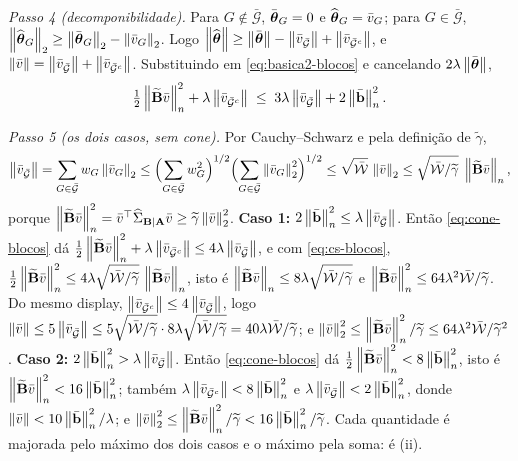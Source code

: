 \documentclass[11pt,a4paper]{article}
\newcommand{\Amat}{\mathbf{A}}
\newcommand{\Bmat}{\mathbf{B}}
\newcommand{\Btil}{\widetilde{\Bmat}}
\newcommand{\bb}{\mathbf{b}}
\newcommand{\gtil}{\widetilde{\gamma}}
\newcommand{\GBA}{\Gramhat_{\Bmat\mid\Amat}}
\newcommand{\thbar}{\bar{\btheta}}
\newcommand{\bbar}{\bar{\bb}}
\newcommand{\vbar}{\bar{v}}
\newcommand{\Gbar}{\bar{\mathcal{G}}}
\begin{document}
\emph{Passo 4 (decomponibilidade).} Para $G \notin \Gbar$, $\thbar_{G} = 0$ e
$\thetahat_{G} = \vbar_{G}$; para $G \in \Gbar$,
$\norm{\thetahat_{G}}_{2} \ge \norm{\thbar_{G}}_{2} - \norm{\vbar_{G}}_{2}$.
Logo $\norm{\thetahat} \ge \norm{\thbar} - \norm{\vbar_{\Gbar}} +
\norm{\vbar_{\Gbar^{c}}}$, e $\norm{\vbar} = \norm{\vbar_{\Gbar}} +
\norm{\vbar_{\Gbar^{c}}}$. Substituindo em \eqref{eq:basica2-blocos} e
cancelando $2\pen\norm{\thbar}$,
\begin{equation}
  \label{eq:cone-blocos}
  \tfrac12\normn{\Btil\vbar}^{2} + \pen\norm{\vbar_{\Gbar^{c}}}
  \;\le\; 3\pen\norm{\vbar_{\Gbar}} + 2\normn{\bbar}^{2}.
\end{equation}

\emph{Passo 5 (os dois casos, sem cone).} Por Cauchy--Schwarz e pela
definição de $\gtil$,
\begin{equation}
  \label{eq:cs-blocos}
  \norm{\vbar_{\Gbar}} = \sum_{G\in\Gbar}w_{G}\norm{\vbar_{G}}_{2}
  \le \Bigl(\sum_{G\in\Gbar}w_{G}^{2}\Bigr)^{1/2}
  \Bigl(\sum_{G\in\Gbar}\norm{\vbar_{G}}_{2}^{2}\Bigr)^{1/2}
  \le \sqrt{\bar{\mathcal{W}}}\,\norm{\vbar}_{2}
  \le \sqrt{\bar{\mathcal{W}}/\gtil}\;\normn{\Btil\vbar},
\end{equation}
porque $\normn{\Btil\vbar}^{2} = \vbar\T\GBA\vbar \ge \gtil\norm{\vbar}_{2}^{2}$.
\textbf{Caso 1:} $2\normn{\bbar}^{2} \le \pen\norm{\vbar_{\Gbar}}$. Então
\eqref{eq:cone-blocos} dá $\frac12\normn{\Btil\vbar}^{2} +
\pen\norm{\vbar_{\Gbar^{c}}} \le 4\pen\norm{\vbar_{\Gbar}}$, e com
\eqref{eq:cs-blocos}, $\frac12\normn{\Btil\vbar}^{2} \le
4\pen\sqrt{\bar{\mathcal{W}}/\gtil}\,\normn{\Btil\vbar}$, isto é
$\normn{\Btil\vbar} \le 8\pen\sqrt{\bar{\mathcal{W}}/\gtil}$ e
$\normn{\Btil\vbar}^{2} \le 64\pen^{2}\bar{\mathcal{W}}/\gtil$. Do mesmo display,
$\norm{\vbar_{\Gbar^{c}}} \le 4\norm{\vbar_{\Gbar}}$, logo $\norm{\vbar} \le
5\norm{\vbar_{\Gbar}} \le 5\sqrt{\bar{\mathcal{W}}/\gtil}\cdot 8\pen\sqrt{\bar{\mathcal{W}}/\gtil}
= 40\pen\bar{\mathcal{W}}/\gtil$; e $\norm{\vbar}_{2}^{2} \le
\normn{\Btil\vbar}^{2}/\gtil \le 64\pen^{2}\bar{\mathcal{W}}/\gtil^{2}$.
\textbf{Caso 2:} $2\normn{\bbar}^{2} > \pen\norm{\vbar_{\Gbar}}$. Então
\eqref{eq:cone-blocos} dá $\frac12\normn{\Btil\vbar}^{2} <
8\normn{\bbar}^{2}$, isto é $\normn{\Btil\vbar}^{2} < 16\normn{\bbar}^{2}$;
também $\pen\norm{\vbar_{\Gbar^{c}}} < 8\normn{\bbar}^{2}$ e
$\pen\norm{\vbar_{\Gbar}} < 2\normn{\bbar}^{2}$, donde $\norm{\vbar} <
10\normn{\bbar}^{2}/\pen$; e $\norm{\vbar}_{2}^{2} \le
\normn{\Btil\vbar}^{2}/\gtil < 16\normn{\bbar}^{2}/\gtil$. Cada quantidade é
majorada pelo máximo dos dois casos e o máximo pela soma: é (ii).
\end{document}
